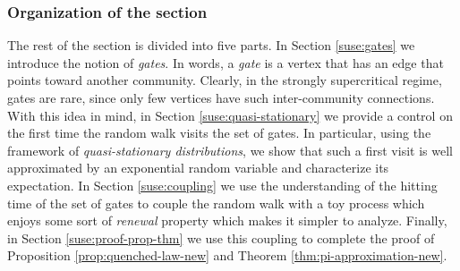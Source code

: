 \documentclass[11pt,oneside]{amsart}
\numberwithin{equation}{section}  %
\theoremstyle{plain}
\begin{document}
\subsubsection*{Organization of the section} The rest of the section is divided into five parts. In Section \ref{suse:gates} we introduce the notion of \emph{gates}. In words, a \emph{gate} is a vertex that has an edge that points toward another community. Clearly, in the strongly supercritical regime, {gates} are rare, since only few vertices have such inter-community connections. With this idea in mind, in Section \ref{suse:quasi-stationary} we provide a control on the first time the random walk visits the set of {gates}. In particular, using the framework of \emph{quasi-stationary distributions}, we show that such a first visit is well approximated by an exponential random variable and characterize its expectation. In Section \ref{suse:coupling} we use the understanding of the hitting time of the set of gates to couple the random walk with a toy process which enjoys some sort of \emph{renewal} property which makes it simpler to analyze. Finally, in Section \ref{suse:proof-prop-thm} we use this coupling to complete the proof of Proposition \ref{prop:quenched-law-new} and Theorem \ref{thm:pi-approximation-new}.
\end{document}

